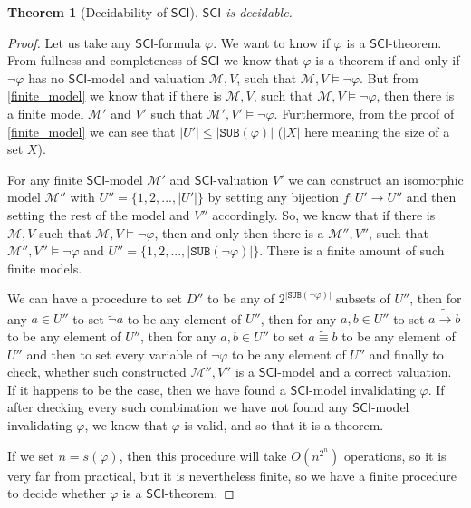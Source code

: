 \documentclass{article}
\newtheorem{theorem}{Theorem}
\theoremstyle{definition}
\theoremstyle{definition}
\theoremstyle{definition}
\newcommand*{\id}{\equiv}
\newcommand*{\ra}{\rightarrow}
\newcommand*{\SUB}{\texttt{SUB}}
\newcommand{\SCI}{$\mathsf{SCI}$\xspace}
\newcommand{\M}{\mathcal{M}\xspace}
\begin{document}
\begin{theorem}[Decidability of \SCI]
    \label{decidability}
    \SCI is decidable.
\end{theorem}
\begin{proof}
    Let us take any \SCI-formula $\varphi$. We want to know if $\varphi$ is a \SCI-theorem. From fullness and completeness of \SCI we know that $\varphi$ is a theorem if and only if $\lnot \varphi$ has no \SCI-model and valuation $\M, V$, such that $\M, V \models \lnot \varphi$. But from \cref{finite_model} we know that if there is $\M, V$, such that $\M, V \models \lnot \varphi$, then there is a finite model $\M'$ and $V'$ such that $\M', V' \models \lnot \varphi$. Furthermore, from the proof of \cref{finite_model} we can see that $|U'| \leq |\SUB(\varphi)|$ ($|X|$ here meaning the size of a set $X$).

    For any finite \SCI-model $\M'$ and \SCI-valuation $V'$ we can construct an
    isomorphic model $\M''$ with $U'' = \{1, 2, ..., |U'|\}$ by setting any
    bijection $f : U' \rightarrow U''$ and then setting the rest of the model and
    $V''$ accordingly. So, we know that if there is $\M, V$ such that $\M, V
        \models \lnot \varphi$, then and only then there is a $\M'', V''$, such that
    $\M'', V'' \models \lnot \varphi$ and $U'' = \{1, 2, ..., |\SUB(\lnot
        \varphi)|\}$. There is a finite amount of such finite models.

    We can have a procedure to set $D''$ to be any of $2^{|\SUB(\lnot \varphi)|}$
    subsets of $U''$, then for any $a \in U''$ to set $\tilde{\lnot}a$ to be any
    element of $U''$, then for any $a, b \in U''$ to set $a \tilde{\ra} b$ to be
    any element of $U''$, then for any $a, b \in U''$ to set $a \tilde{\id} b$ to
    be any element of $U''$ and then to set every variable of $\lnot \varphi$ to be
    any element of $U''$ and finally to check, whether such constructed $\M'', V''$
    is a \SCI-model and a correct valuation. If it happens to be the case, then we
    have found a \SCI-model invalidating $\varphi$. If after checking every such
    combination we have not found any \SCI-model invalidating $\varphi$, we know
    that $\varphi$ is valid, and so that it is a theorem.

    If we set $n = s(\varphi)$, then this procedure will take $O({n} ^ {2^n})$
    operations, so it is very far from practical, but it is nevertheless finite, so
    we have a finite procedure to decide whether $\varphi$ is a \SCI-theorem.

\end{proof}
\end{document}
